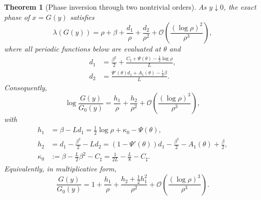\documentclass[11pt,oneside]{article}
\numberwithin{equation}{section}
\newtheorem{theorem}{Theorem}[section]
\theoremstyle{definition}
\theoremstyle{remark}
\newcommand{\bigO}{\mathcal O}
\begin{document}
\begin{theorem}[Phase inversion through two nontrivial orders]
\label{thm:phase-two-orders}
As $y\downarrow0$, the exact phase of $x=G(y)$ satisfies
\begin{equation}
 \boxed{
 \lambda(G(y))=
 \rho+\beta+\frac{d_1}{\rho}+\frac{d_2}{\rho^2}
 +\bigO\!\left(\frac{(\log\rho)^2}{\rho^3}\right),}
 \label{eq:lambda-inverse-two-orders}
\end{equation}
where all periodic functions below are evaluated at $\theta$ and
\begin{align}
 d_1&=\frac{\beta^2}{2}
 +\frac{C_{\sharp}+\Psi(\theta)-\tfrac12\log\rho}{L},
 \label{eq:d1-endpoint}\\
 d_2&=\frac{\Psi'(\theta)d_1+A_1(\theta)-\tfrac12\beta}{L}.
 \label{eq:d2-endpoint}
\end{align}
Consequently,
\begin{equation}
 \boxed{
 \log\frac{G(y)}{G_0(y)}
 =\frac{h_1}{\rho}+\frac{h_2}{\rho^2}
 +\bigO\!\left(\frac{(\log\rho)^3}{\rho^3}\right),}
 \label{eq:log-inverse-two-orders}
\end{equation}
with
\begin{align}
 h_1&=\beta-Ld_1
 =\frac12\log\rho+\kappa_0-\Psi(\theta),
 \label{eq:h1}\\
 h_2&=d_1-\frac{\beta^2}{2}-Ld_2
 =(1-\Psi'(\theta))d_1-\frac{\beta^2}{2}
   -A_1(\theta)+\frac\beta2,
 \label{eq:h2}\\
 \kappa_0&:=\beta-\frac L2\beta^2-C_{\sharp}
 =\frac1{2L}-\frac L8-C_{\sharp}.
 \label{eq:kappa0}
\end{align}
Equivalently, in multiplicative form,
\begin{equation}
 \boxed{
 \frac{G(y)}{G_0(y)}
 =1+\frac{h_1}{\rho}
 +\frac{h_2+\tfrac12h_1^2}{\rho^2}
 +\bigO\!\left(\frac{(\log\rho)^3}{\rho^3}\right).}
 \label{eq:inverse-multiplicative-two-orders}
\end{equation}
\end{theorem}
\end{document}
